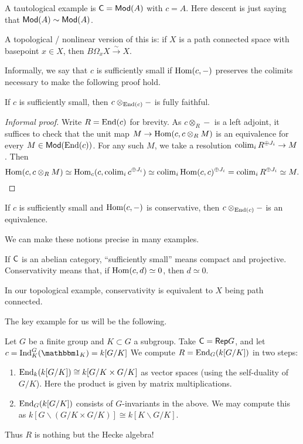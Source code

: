\documentclass{article}
\begin{document}
\begin{ex}
	A tautological example is $\mathsf{C} = \mathsf{Mod}(A)$ with $c = A$.
	Here descent is just saying that $\mathsf{Mod}(A) \sim \mathsf{Mod}(A)$.
\end{ex}

\begin{ex}
	A topological / nonlinear version of this is: if $X$ is a path connected space with basepoint $x \in X$, then $B \Omega_x X \xrightarrow{\sim} X$.
\end{ex}

Informally, we say that $c$ is sufficiently small if $\operatorname{Hom}(c, -)$ preserves the colimits necessary to make the following proof hold.

\begin{prop}
	If $c$ is sufficiently small, then $c \otimes_{\operatorname{End}(c)} -$ is fully faithful.
\end{prop}

\begin{proof}[Informal proof]
	Write $R = \operatorname{End}(c)$ for brevity.
	As $c \otimes_R -$ is a left adjoint, it suffices to check that the unit map $M \to \operatorname{Hom}(c, c \otimes_R M)$ is an equivalence for every $M \in \mathsf{Mod}(\operatorname{End}(c))$.
	For any such $M$, we take a resolution $\operatorname{colim}_i R^{\oplus J_i} \to M$.
	Then 
	\[
		\operatorname{Hom}(c, c \otimes_R M) \simeq \operatorname{Hom}_c(c, \operatorname{colim}_i c^{\oplus J_i}) \simeq \operatorname{colim}_i \operatorname{Hom}(c, c)^{\oplus J_i} = \operatorname{colim}_i R^{\oplus J_i} \simeq M. \qedhere
	\]
\end{proof}

\begin{prop}
	If $c$ is sufficiently small and $\operatorname{Hom}(c, -)$ is conservative, then $c \otimes_{\operatorname{End}(c)} -$ is an equivalence.
\end{prop}

We can make these notions precise in many examples.

\begin{ex}
	If $\mathsf{C}$ is an abelian category, ``sufficiently small'' means compact and projective.
	Conservativity means that, if $\operatorname{Hom}(c, d) \simeq 0$, then $d \simeq 0$.
\end{ex}

\begin{ex}
	In our topological example, conservativity is equivalent to $X$ being path connected.
\end{ex}

The key example for us will be the following.

\begin{ex}
	Let $G$ be a finite group and $K \subset G$ a subgroup.
	Take $\mathsf{C} = \mathsf{Rep} G$, and let $c = \Indop_K^G(\onebb_K) = k[G / K]$
	We compute $R = \operatorname{End}_G(k[G / K])$ in two steps:
	\begin{enumerate}
		\item $\operatorname{End}_k(k[G / K]) \cong k[G / K \times G / K]$ as vector spaces (using the self-duality of $G / K$).
			Here the product is given by matrix multiplications.
		\item $\operatorname{End}_G(k[G / K])$ consists of $G$-invariants in the above.
			We may compute this as $k[G \backslash (G / K \times G / K)] \cong k[K \backslash G / K]$.
	\end{enumerate}
	Thus $R$ is nothing but the Hecke algebra!
\end{ex}
\end{document}

